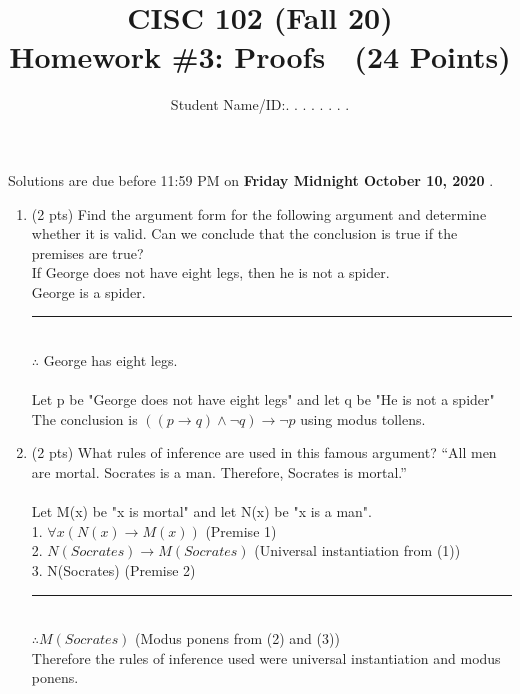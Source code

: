 \documentclass[12pt]{article}
\title{CISC 102 (Fall 20)\\ Homework \#3: Proofs $\;$   (24 Points) }
\author{Student Name/ID:. . . . . . . .}
\date{}
\begin{document}
\maketitle

\par\noindent Solutions are due before 11:59 PM on \textbf{Friday  Midnight October 10, 2020 }.


\begin{enumerate}

\item (2 pts)
Find the argument form for the following argument and
determine whether it is valid. Can we conclude that the
conclusion is true if the premises are true?\\
If George does not have eight legs, then he is not a
spider.\\
George is a spider.\\
\rule{8cm}{.1pt}\\
$\therefore$ George has eight legs.\\
\\Let p be "George does not have eight legs" and let q be "He is not a spider"
\\The conclusion is $(( p \rightarrow q)\land \lnot q)\rightarrow \lnot p$ using modus tollens.


\item (2 pts)
What rules of inference are used in this famous argument?
“All men are mortal. Socrates is a man. Therefore,
Socrates is mortal.”\\
\\Let M(x) be "x is mortal" and let N(x) be "x is a man".
\\1. $\forall x (N(x) \rightarrow M(x))$ (Premise 1)
\\2. $N(Socrates) \rightarrow M(Socrates)$ (Universal instantiation from (1))
\\3. N(Socrates) (Premise 2)\\
\rule{1.5cm}{.1pt}
\\$\therefore M(Socrates)$ (Modus ponens from (2) and (3))
\\Therefore the rules of inference used were universal instantiation and modus ponens.


\end{enumerate}
\end{document}
